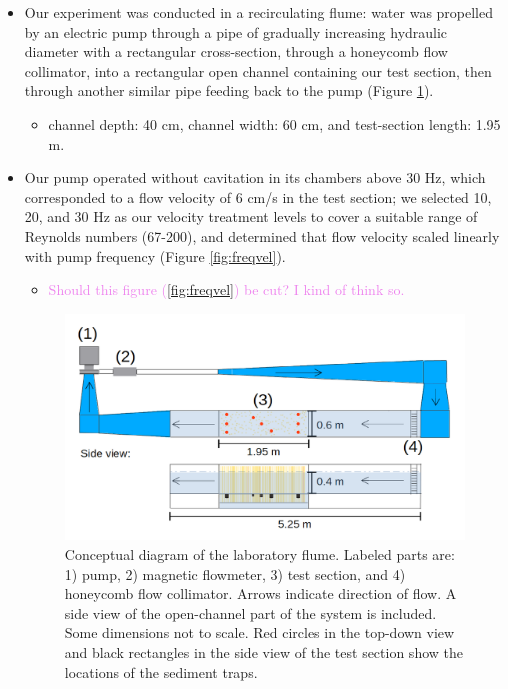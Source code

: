 \documentclass{article}
\begin{document}
\begin{itemize}
    \item Our experiment was conducted in a recirculating flume: water was propelled by an electric pump through a pipe of gradually increasing hydraulic diameter with a rectangular cross-section, through a honeycomb flow collimator, into a rectangular open channel containing our test section, then through another similar pipe feeding back to the pump (Figure \ref{fig:floorplan}).
    \begin{itemize}
        \item channel depth: 40 cm, channel width: 60 cm, and test-section length: 1.95 m.
    \end{itemize}
    \item Our pump operated without cavitation in its chambers above 30 Hz, which corresponded to a flow velocity of 6 cm/s in the test section; we selected 10, 20, and 30 Hz as our velocity treatment levels to cover a suitable range of Reynolds numbers (67-200), and determined that flow velocity scaled linearly with pump frequency (Figure \ref{fig:freqvel}).
    \begin{itemize}
        \item \textcolor{violet}{Should this figure (\ref{fig:freqvel}) be cut? I kind of think so.}
    \end{itemize}

\begin{figure}[htbp]
\includegraphics[width=15cm]{../pics/flume_with_sedtraps.png}
\centering
\caption{Conceptual diagram of the laboratory flume. Labeled parts are: 1) pump, 2) magnetic flowmeter, 3) test section, and 4) honeycomb flow collimator. Arrows indicate direction of flow. A side view of the open-channel part of the system is included. Some dimensions not to scale. Red circles in the top-down view and black rectangles in the side view of the test section show the locations of the sediment traps.}
\label{fig:floorplan}
\end{figure}


\end{itemize}
\end{document}

